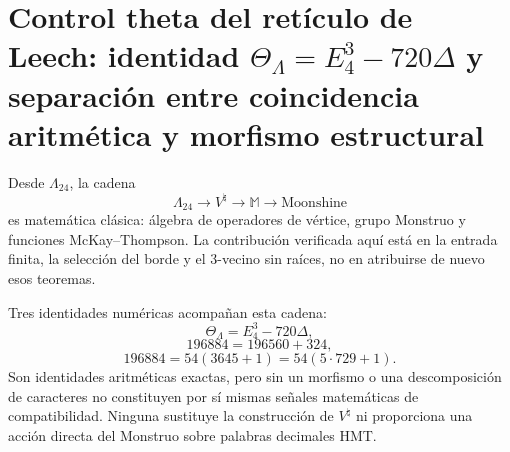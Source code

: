 \section{Control theta del retículo de Leech: identidad \texorpdfstring{\(\Theta_{\Lambda}=E_4^3-720\Delta\)}{Theta Lambda = E4^3 - 720 Delta} y separación entre coincidencia aritmética y morfismo estructural}
\label{sec:control-theta-leech}

Desde \(\Lambda_{24}\), la cadena
\[
\Lambda_{24}
\longrightarrow V^\natural
\longrightarrow\mathbb M
\longrightarrow\text{Moonshine}
\]
es matemática clásica: álgebra de operadores de vértice, grupo Monstruo y
funciones McKay--Thompson. La contribución verificada aquí está en la entrada
finita, la selección del borde y el \(3\)-vecino sin raíces, no en atribuirse de
nuevo esos teoremas.

Tres identidades numéricas acompañan esta cadena:
\[
\Theta_{\Lambda}=E_4^3-720\Delta,
\]
\[
196884=196560+324,
\]
\[
196884=54(3645+1)=54(5\cdot729+1).
\]
Son identidades aritméticas exactas, pero sin un morfismo o una descomposición
de caracteres no constituyen por sí mismas señales matemáticas de
compatibilidad. Ninguna sustituye la construcción de \(V^\natural\) ni
proporciona una acción directa del Monstruo sobre palabras decimales HMT.
